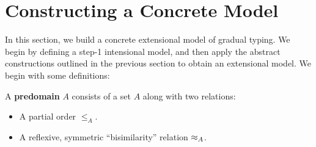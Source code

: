 \section{Constructing a Concrete Model}\label{sec:concrete-model}

In this section, we build a concrete extensional model of gradual typing.
We begin by defining a step-1 intensional model, and then
apply the abstract constructions outlined in the previous section
to obtain an extensional model.
We begin with some definitions:
\begin{definition}
A \textbf{predomain} $A$ consists of a set $A$ along with two relations:
\begin{itemize}
    \item A partial order $\le_A$.
    \item A reflexive, symmetric ``bisimilarity'' relation $\approx_A$.
\end{itemize}
\end{definition}

